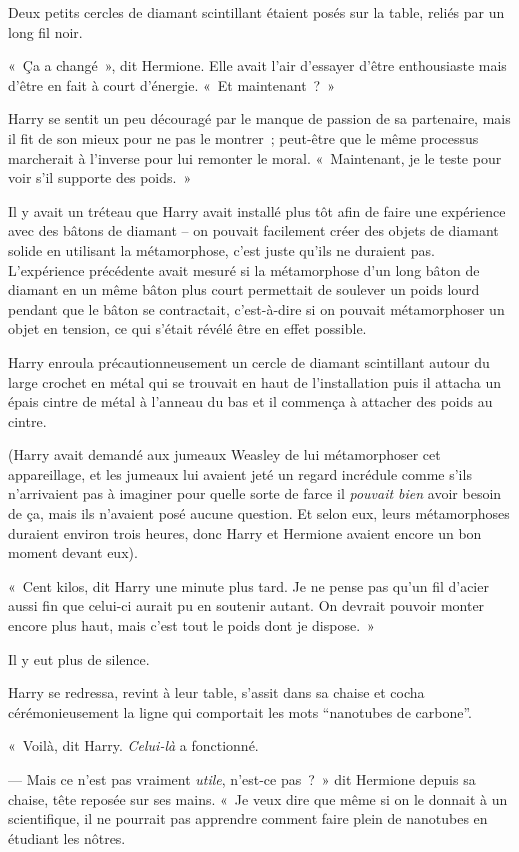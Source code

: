 Deux petits cercles de diamant scintillant étaient posés sur la table, reliés par un long fil noir.

«~Ça a changé~», dit Hermione.
Elle avait l'air d'essayer d'être enthousiaste mais d'être en fait à court d'énergie.
«~Et maintenant~?~»

Harry se sentit un peu découragé par le manque de passion de sa partenaire, mais il fit de son mieux pour ne pas le montrer~; peut-être que le même processus marcherait à l'inverse pour lui remonter le moral.
«~Maintenant, je le teste pour voir s'il supporte des poids.~»

Il y avait un tréteau que Harry avait installé plus tôt afin de faire une expérience avec des bâtons de diamant -- on pouvait facilement créer des objets de diamant solide en utilisant la métamorphose, c'est juste qu'ils ne duraient pas.
L'expérience précédente avait mesuré si la métamorphose d'un long bâton de diamant en un même bâton plus court permettait de soulever un poids lourd pendant que le bâton se contractait, c'est-à-dire si on pouvait métamorphoser un objet en tension, ce qui s'était révélé être en effet possible.

Harry enroula précautionneusement un cercle de diamant scintillant autour du large crochet en métal qui se trouvait en haut de l'installation puis il attacha un épais cintre de métal à l'anneau du bas et il commença à attacher des poids au cintre.

(Harry avait demandé aux jumeaux Weasley de lui métamorphoser cet appareillage, et les jumeaux lui avaient jeté un regard incrédule comme s'ils n'arrivaient pas à imaginer pour quelle sorte de farce il \emph{pouvait bien} avoir besoin de ça, mais ils n'avaient posé aucune question.
Et selon eux, leurs métamorphoses duraient environ trois heures, donc Harry et Hermione avaient encore un bon moment devant eux).

«~Cent kilos, dit Harry une minute plus tard.
Je ne pense pas qu'un fil d'acier aussi fin que celui-ci aurait pu en soutenir autant.
On devrait pouvoir monter encore plus haut, mais c'est tout le poids dont je dispose.~»

Il y eut plus de silence.

Harry se redressa, revint à leur table, s'assit dans sa chaise et cocha cérémonieusement la ligne qui comportait les mots “nanotubes de carbone”.

«~Voilà, dit Harry.
\emph{Celui-là} a fonctionné.

--- Mais ce n'est pas vraiment \emph{utile}, n'est-ce pas~?~»
dit Hermione depuis sa chaise, tête reposée sur ses mains.
«~Je veux dire que même si on le donnait à un scientifique, il ne pourrait pas apprendre comment faire plein de nanotubes en étudiant les nôtres.

